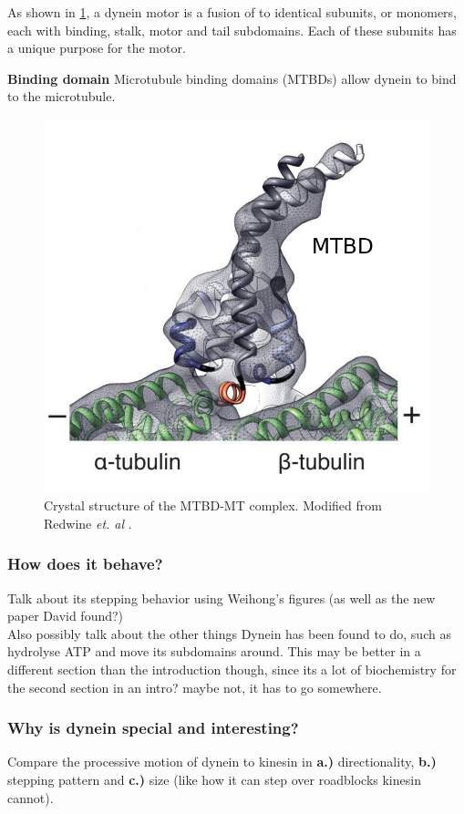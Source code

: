 \documentclass[10pt]{article} %
\begin{document}
As shown in \ref{dynein-artist-rendition-2}, a dynein motor is a fusion of to identical subunits, or monomers, each with binding, stalk, motor and tail subdomains. Each of these subunits has a unique purpose for the motor.

\textbf{Binding domain}
Microtubule binding domains (MTBDs) allow dynein to bind to the microtubule. 

\begin{figure}[h]
  \centering
  \includegraphics[width=.65\textwidth,keepaspectratio]{../figures/mtbd-complex.png}
  \caption{Crystal structure of the MTBD-MT complex. Modified from Redwine \textit{et. al} \cite{redwineMTBDcomplex}.}
  \label{dynein-artist-rendition-2}
\end{figure}

\subsubsection{How does it behave?}
Talk about its stepping behavior using Weihong's figures (as well as the new paper David found?)\\

Also possibly talk about the other things Dynein has been found to do, such as hydrolyse ATP and
move its subdomains around. This may be better in a different section than the introduction though,
since its a lot of biochemistry for the second section in an intro? maybe not, it has to go somewhere.

\subsubsection{Why is dynein special and interesting?}
Compare the processive motion of dynein to kinesin in \textbf{a.)} directionality, \textbf{b.)}
stepping pattern and \textbf{c.)} size (like how it can step over roadblocks kinesin cannot).\\
\end{document}
